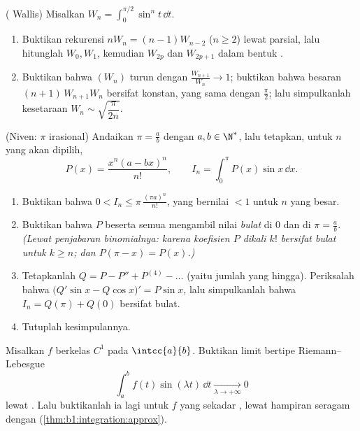 \begin{exercise}[$\star\star\star$]\label{exo:b1:integration:8}
( Wallis) Misalkan $W_n = \int_0^{\pi/2} \sin^n t\,\dd t$.
\begin{enumerate}
  \item Buktikan rekurensi $n W_n = (n-1) W_{n-2}$ ($n \geq 2$) lewat
        parsial, lalu hitunglah $W_0, W_1$, kemudian $W_{2p}$ dan $W_{2p+1}$
        dalam bentuk .
  \item Buktikan bahwa $(W_n)$ turun dengan $\frac{W_{n+1}}{W_n}
        \to 1$; buktikan bahwa besaran $(n+1)\,W_{n+1} W_n$ bersifat
        konstan, yang sama dengan $\frac\pi2$; lalu simpulkanlah kesetaraan
        $W_n \sim \sqrt{\dfrac{\pi}{2n}}$.
\end{enumerate}
\end{exercise}

\begin{exercise}[$\star\star\star$]\label{exo:b1:integration:9}
(Niven: $\pi$ irasional) Andaikan $\pi = \frac ab$ dengan $a, b \in
\N^*$, lalu tetapkan, untuk $n$ yang akan dipilih,
\[
P(x) = \frac{x^n (a - bx)^n}{n!},
\qquad
I_n = \int_0^{\pi} P(x)\sin x\, \dd x .
\]
\begin{enumerate}
  \item Buktikan bahwa $0 < I_n \leq \pi\,\frac{(\pi a)^n}{n!}$, yang
        bernilai $< 1$ untuk $n$ yang besar.
  \item Buktikan bahwa $P$ beserta semua  mengambil nilai
        \emph{bulat} di $0$ dan di $\pi = \frac ab$. \emph{(Lewat penjabaran
        binomialnya: karena koefisien $P$ dikali $k!$ bersifat bulat
        untuk $k \geq n$; dan $P(\pi - x) = P(x)$.)}
  \item Tetapkanlah $Q = P - P'' + P^{(4)} - \dots$ (yaitu jumlah yang hingga). Periksalah
        bahwa $\bigl(Q'\sin x - Q\cos x\bigr)' = P \sin x$, lalu simpulkanlah
        bahwa $I_n = Q(\pi) + Q(0)$ bersifat bulat.
  \item Tutuplah kesimpulannya.
\end{enumerate}
\end{exercise}

\begin{exercise}[$\star\star\star$]\label{exo:b1:integration:10}
Misalkan $f$ berkelas $C^1$ pada $\intcc{a}{b}$. Buktikan limit bertipe
Riemann--Lebesgue
\[
\int_a^b f(t)\sin(\lambda t)\,\dd t \xrightarrow[\lambda \to
+\infty]{} 0
\]
lewat . Lalu buktikanlah ia lagi untuk $f$ yang sekadar
, lewat hampiran seragam dengan 
(\cref{thm:b1:integration:approx}).
\end{exercise}


